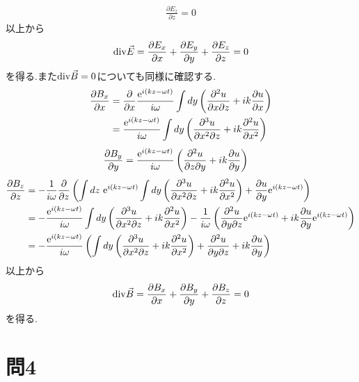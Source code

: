 \documentclass[uplatex,a4j,11pt,dvipdfmx]{jsarticle}
\numberwithin{equation}{section}
\begin{document}
\begin{align}
  \frac{\partial E_z}{\partial z}=0
\end{align}
以上から
\begin{align}
  {\rm div}\vec{E}=\frac{\partial E_x}{\partial x}+\frac{\partial E_y}{\partial y}+\frac{\partial E_z}{\partial z}=0
\end{align}
を得る.また${\rm div}\vec{B}=0$についても同様に確認する.
\begin{align}
  \begin{split}
    \frac{\partial B_x}{\partial x}&=\frac{\partial}{\partial x}\frac{{\rm e}^{i(kz-\omega t)}}{i\omega}\int dy\left(\frac{\partial^2u}{\partial x\partial z}+ik\frac{\partial u}{\partial x}\right)\\
    &=\frac{{\rm e}^{i(kz-\omega t)}}{i\omega}\int dy\left(\frac{\partial^3u}{\partial x^2\partial z}+ik\frac{\partial^2 u}{\partial x^2}\right)
  \end{split}
\end{align}
\begin{align}
  \begin{split}
    \frac{\partial B_y}{\partial y}&=\frac{{\rm e}^{i(kz-\omega t)}}{i\omega}\left(\frac{\partial^2 u}{\partial z\partial y}+ik\frac{\partial u}{\partial y}\right)
  \end{split}
\end{align}
\begin{align}
  \begin{split}
    \frac{\partial B_z}{\partial z}&=-\frac{1}{i\omega}\frac{\partial}{\partial z}\left(\int dz\ {\rm e}^{i(kz-\omega t)}\int dy\left(
    \frac{\partial^3u}{\partial x^2\partial z}+ik\frac{\partial^2u}{\partial x^2}
    \right)+\frac{\partial u}{\partial y}{\rm e}^{i(kz-\omega t)}\right)\\
    &=-\frac{{\rm e}^{i(kz-\omega t)}}{i\omega}\int dy\left(
    \frac{\partial^3u}{\partial x^2\partial z}+ik\frac{\partial^2u}{\partial x^2}
    \right)
    -\frac{1}{i\omega}\left(
    \frac{\partial^2 u}{\partial y\partial z}{\rm e}^{i(kz-\omega t)}
    +ik\frac{\partial u}{\partial y}{\rm e}^{i(kz-\omega t)}
    \right)\\
    &=-\frac{{\rm e}^{i(kz-\omega t)}}{i\omega}\left(
    \int dy\left(
    \frac{\partial^3u}{\partial x^2\partial z}+ik\frac{\partial^2u}{\partial x^2}
    \right)
    +\frac{\partial^2 u}{\partial y\partial z}+ik\frac{\partial u}{\partial y}
    \right)
  \end{split}
\end{align}
以上から
\begin{align}
  {\rm div}\vec{B}=\frac{\partial B_x}{\partial x}+\frac{\partial B_y}{\partial y}+\frac{\partial B_z}{\partial z}=0
\end{align}
を得る.
\setcounter{section}{4}
\section*{問4}
\end{document}
